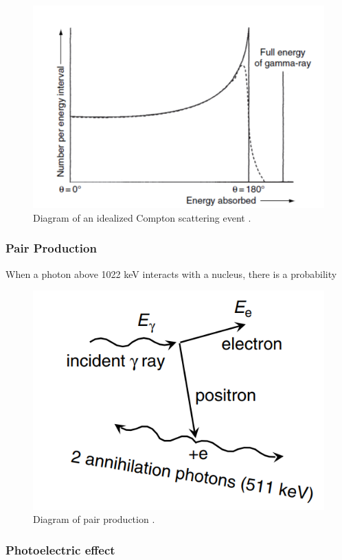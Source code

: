 \begin{figure}[H]
\centering
\includegraphics[width=0.75\linewidth]{images/ideal_compton}
\caption{Diagram of an idealized Compton scattering event \cite{gilmore}.}
\label{fig:ideal_compton}
\end{figure}



\subsubsection{Pair Production}

When a photon above 1022 keV interacts with a nucleus, there is a probability  

\begin{figure}[H]
\centering
\includegraphics[width=0.75\linewidth]{images/pair_production}
\caption{Diagram of pair production \cite{gilmore}.}
\label{fig:pair_production}
\end{figure}




\subsubsection{Photoelectric effect}


